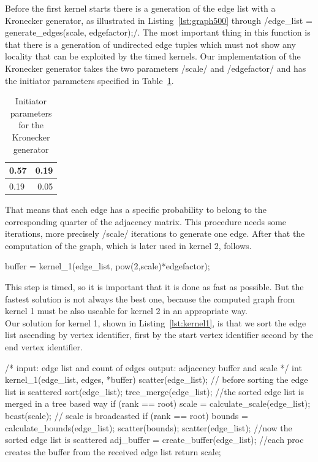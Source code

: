 \documentclass[12pt,a4paper]{article}
\begin{document}
Before the first kernel starts there is a generation of the edge list with a Kronecker generator, as illustrated in Listing~\ref{lst:graph500} through \cinline/edge_list = generate_edges(scale, edgefactor);/. The most important thing in this function is that there is a generation of undirected edge tuples which must not show any locality that can be exploited by the timed kernels. Our implementation of the Kronecker generator takes the two parameters \cinline/scale/ and \cinline/edgefactor/ and has the initiator parameters specified in Table~\ref{tab:kronecker}.\\
\begin{table}[h]
	\centering
	\begin{tabular}{ | l | r |}
  		\hline
  		0.57 & 0.19 \\ \hline
  		0.19 & 0.05 \\ \hline
	\end{tabular}
	\caption{Initiator parameters for the Kronecker generator}
  	\label{tab:kronecker}
\end{table}
That means that each edge has a specific probability to belong to the corresponding quarter of the adjacency matrix. This procedure needs some iterations, more precisely \cinline/scale/ iterations to generate one edge.
After that the computation of the graph, which is later used in kernel 2, follows.
\begin{ccode}
buffer = kernel_1(edge_list, pow(2,scale)*edgefactor);
\end{ccode}
This step is timed, so it is important that it is done as fast as possible. But the fastest solution is not always the best one, because the computed graph from kernel 1 must be also useable for kernel 2 in an appropriate way.\\
Our solution for kernel 1, shown in Listing~\ref{lst:kernel1}, is that we sort the edge list ascending by vertex identifier, first by the start vertex identifier second by the end vertex identifier.
\begin{listing}[H]
\begin{ccode}
/*
input: edge list and count of edges
output: adjacency buffer and scale
*/
int kernel_1(edge_list, edges, *buffer){
	scatter(edge_list); // before sorting the edge list is scattered
	sort(edge_list);
	tree_merge(edge_list); //the sorted edge list is merged in a tree based way
	if (rank == root){
		scale = calculate_scale(edge_list);
	}
	bcast(scale); // scale is broadcasted
	if (rank == root){
		bounds = calculate_bounds(edge_list);
	}
	scatter(bounds);
	scatter(edge_list); //now the sorted edge list is scattered
	adj_buffer = create_buffer(edge_list); //each proc creates the buffer from the received edge list
	return scale;
}
\end{ccode}
\caption{Kernel 1}
\label{lst:kernel1}
\end{listing}
\end{document}
